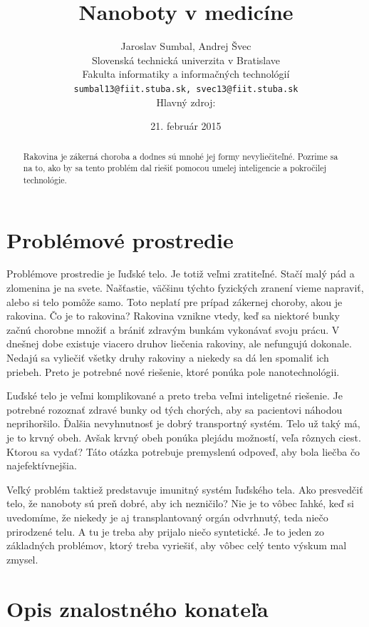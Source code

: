 \documentclass[10pt,twoside,slovak,a4paper]{article}
\title{Nanoboty v medicíne}
\author{Jaroslav Sumbal, Andrej Švec\\[2pt]
	{\small Slovenská technická univerzita v Bratislave}\\
	{\small Fakulta informatiky a informačných technológií}\\
	{\small \texttt{sumbal13@fiit.stuba.sk, svec13@fiit.stuba.sk}}\\
	{\small Hlavný zdroj: \cite{Zdroj}}
	}
\date{\small 21. február 2015} %
\begin{document}
\maketitle


\begin{abstract}
Rakovina je zákerná choroba a dodnes sú mnohé jej formy nevyliečiteľné. Pozrime sa na to, ako by sa tento problém dal riešiť pomocou umelej inteligencie a pokročilej technológie.

\end{abstract}

\section{Problémové prostredie}

Problémove prostredie je ľuďské telo. Je totiž veľmi zratiteľné. Stačí malý pád a zlomenina je na svete. Našťastie, väčšinu týchto fyzických zranení vieme napraviť, alebo si telo pomôže samo. Toto neplatí pre prípad zákernej choroby, akou je rakovina. Čo je to rakovina? Rakovina vznikne vtedy, keď sa niektoré bunky začnú chorobne množiť a brániť zdravým bunkám vykonávať svoju prácu. V dnešnej dobe existuje viacero druhov liečenia rakoviny, ale nefungujú dokonale. Nedajú sa vyliečiť všetky druhy rakoviny a niekedy sa dá len spomaliť ich priebeh. Preto je potrebné nové riešenie, ktoré ponúka pole nanotechnológii.

Ľuďské telo je veľmi komplikované a preto treba veľmi inteligetné riešenie. Je potrebné rozoznať zdravé bunky od tých chorých, aby sa pacientovi náhodou neprihoršilo. Ďalšia nevyhnutnosť je dobrý transportný systém. Telo už taký má, je to krvný obeh. Avšak krvný obeh ponúka plejádu možností, veľa rôznych ciest. Ktorou sa vydať? Táto otázka potrebuje premyslenú odpoveď, aby bola liečba čo najefektívnejšia.

Veľký problém taktiež predstavuje imunitný systém ľuďského tela. Ako presvedčiť telo, že nanoboty sú preň dobré, aby ich nezničilo? Nie je to vôbec ľahké, keď si uvedomíme, že niekedy je aj transplantovaný orgán odvrhnutý, teda niečo prirodzené telu. A tu je treba aby prijalo niečo syntetické. Je to jeden zo základných problémov, ktorý treba vyriešiť, aby vôbec celý tento výskum mal zmysel.

\section{Opis znalostného konateľa}
\end{document}
